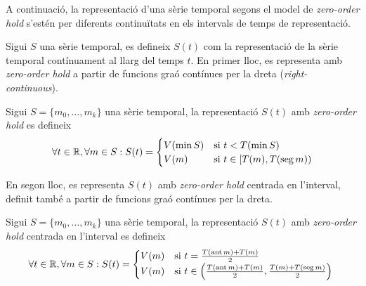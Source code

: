 





A continuació,  la representació  d'una sèrie temporal segons el model de \emph{zero-order hold} s'estén per diferents continuïtats en els intervals de temps de representació.

Sigui $S$ una sèrie temporal, es defineix $S(t)$ com la representació
de la sèrie temporal contínuament al llarg del temps $t$.  En primer
lloc, es representa amb \emph{zero-order hold} a partir de funcions
graó contínues per la dreta (\emph{right-continuous}).

\begin{definition}
Sigui $S=\{m_0,\ldots,m_k\}$ una sèrie temporal, la representació  $S(t)$ amb \emph{zero-order hold} es defineix
\[
\forall t \in \mathbb{R} ,\forall m \in S: S(t) =
\begin{cases}
  V(\min S) & \text{si } t < T(\min S) \\
  V(m) & \text{si }  t\in [T(m),T(\operatorname*{seg} m))
\end{cases}
\]
\end{definition}

En segon lloc, es representa $S(t)$ amb \emph{zero-order hold} centrada en
l'interval, definit també a partir de funcions graó contínues per la
dreta.

\begin{definition}
  Sigui $S=\{m_0,\ldots,m_k\}$ una sèrie temporal, la representació
  $S(t)$ amb \emph{zero-order hold} centrada en l'interval es defineix
\[
\forall t \in \mathbb{R}  ,\forall m \in S:
S(t) =  
\begin{cases}
  V(m) & \text{si } t = \frac{T(\operatorname*{ant} m)+T(m)}{2} \\
  V(m) & \text{si } t\in \left( \frac{T(\operatorname*{ant} m)+T(m)}{2},\frac{T(m)+T(\operatorname*{seg} m)}{2} \right) \
\end{cases}
\]
\end{definition}

